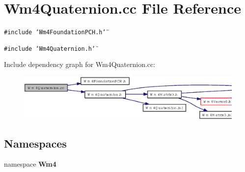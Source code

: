 \section{Wm4Quaternion.cc File Reference}
\label{Wm4Quaternion_8cc}
{\tt \#include \char`\"{}Wm4Foundation\-PCH.h\char`\"{}}\par
{\tt \#include \char`\"{}Wm4Quaternion.h\char`\"{}}\par


Include dependency graph for Wm4Quaternion.cc:\begin{figure}[H]
\begin{center}
\leavevmode
\includegraphics[width=386pt]{Wm4Quaternion_8cc__incl}
\end{center}
\end{figure}
\subsection*{Namespaces}
\begin{CompactItemize}
\item 
namespace {\bf Wm4}
\end{CompactItemize}
